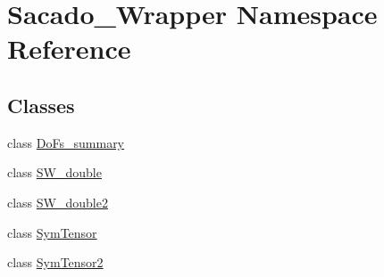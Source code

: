 \hypertarget{namespaceSacado__Wrapper}{}\section{Sacado\+\_\+\+Wrapper Namespace Reference}
\label{namespaceSacado__Wrapper}
\subsection*{Classes}
\begin{DoxyCompactItemize}
\item 
class \hyperlink{classSacado__Wrapper_1_1DoFs__summary}{Do\+Fs\+\_\+summary}
\item 
class \hyperlink{classSacado__Wrapper_1_1SW__double}{S\+W\+\_\+double}
\item 
class \hyperlink{classSacado__Wrapper_1_1SW__double2}{S\+W\+\_\+double2}
\item 
class \hyperlink{classSacado__Wrapper_1_1SymTensor}{Sym\+Tensor}
\item 
class \hyperlink{classSacado__Wrapper_1_1SymTensor2}{Sym\+Tensor2}
\end{DoxyCompactItemize}
